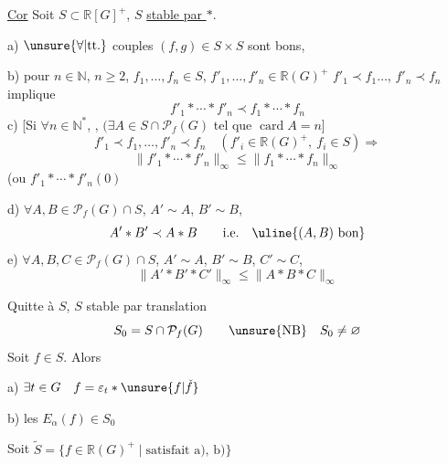 \uline{Cor} Soit $S\subset\mathbb R[G]^+$, $S$ \uline{stable par $\ast$}.

 a) $\unsure{\forall|\text{tt.}}$ couples $(f,g)\in S\times S$ sont bons, 

b)  pour  $n\in\mathbb N$, $n\geq2$, $f_1,\ldots,f_n\in S$, $f'_1,\ldots,f'_n\in\mathbb R(G)^+$
$f'_1\prec f_1\ldots$, $f'_n\prec f_n$ implique
\[
f'_1\ast\cdots\ast f'_n\prec f_1\ast\cdots\ast f_n
\]
c) [Si $\forall n\in\mathbb N^\ast$, , $(\exists A\in S\cap\mathcal P_f(G)$ tel que $\operatorname{card}A=n$]
\[
f'_1\prec f_1,\ldots,f'_n\prec f_n\quad(f'_i\in\mathbb R(G)^+,\ f_i\in S)\Longrightarrow
\]
\[
\|f'_1\ast\cdots\ast f'_n\|_\infty\leq\|f_1\ast\cdots\ast f_n\|_\infty
\]
(ou $f'_1\ast\cdots\ast f'_n(0)$


d) $\forall A,B\in\mathcal P_f(G)\cap S$, $A'\sim A$, $B'\sim B$, \unsure{$\ldots$}
\[
A'\ast B'\prec A\ast B\qquad\text{i.e.}\quad\uline{(A,B)\text{ bon}}
\]
e) $\forall A,B,C\in\mathcal P_f(G)\cap S$, $A'\sim A$, $B'\sim B$, $C'\sim C$, \unsure{$\ldots$}
\[
\|A'\ast B'\ast C'\|_\infty\leq\|A\ast B\ast C\|_\infty
\]


Quitte à  $S$,  $S$ stable par translation
\[
S_0=S\cap\mathcal P_f(G)\qquad\unsure{\text{NB}}\quad S_0\ne\varnothing
\]
Soit $f\in S$. Alors

a) $\exists t\in G\quad f=\varepsilon_t\ast\unsure{f|\check f}$

b) les $E_\alpha(f)\in S_0$


Soit  $\tilde S=\{f\in\mathbb R(G)^+\mid\text{satisfait a), b)}\}$

